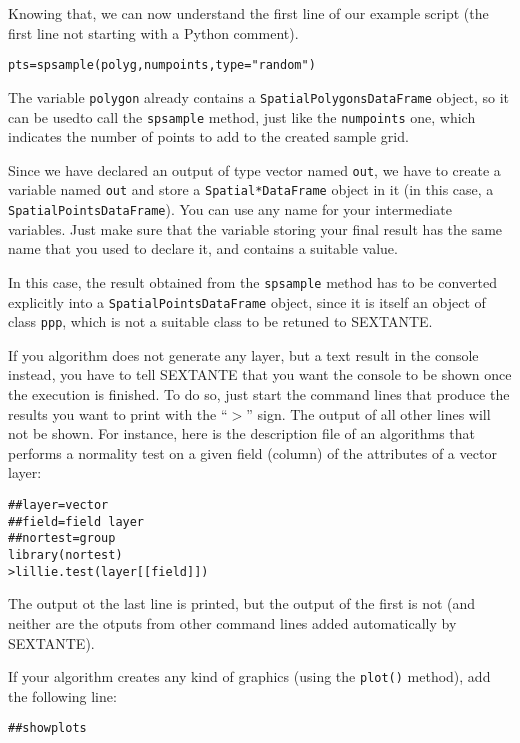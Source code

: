 Knowing that, we can now understand the first line of our example script (the first line not starting with a Python comment).


\begin{verbatim}
pts=spsample(polyg,numpoints,type="random")
\end{verbatim}

The variable \texttt{polygon} already contains a \texttt{SpatialPolygonsDataFrame} object, so it can be usedto call the \texttt{spsample} method, just like the \texttt{numpoints} one, which indicates the number of points to add to the created sample grid.

Since we have declared an output of type vector named \texttt{out}, we have to create a variable named \texttt{out} and store a \texttt{Spatial*DataFrame} object in it (in this case, a \texttt{SpatialPointsDataFrame}). You can use any name for your intermediate variables. Just make sure that the variable storing your final result has the same name that you used to declare it, and contains a suitable value.

In this case, the result obtained from the \texttt{spsample} method has to be converted explicitly into a \texttt{SpatialPointsDataFrame} object, since it is itself an object of class \texttt{ppp}, which is not a suitable class to be retuned to SEXTANTE.

If you algorithm does not generate any layer, but a text result in the console instead, you have to tell SEXTANTE that you want the console to be shown once the execution is finished. To do so, just start the command lines that produce the results you want to print with the ``$>$'' sign. The output of all other lines will not be shown. For instance, here is the description file of an algorithms that performs a normality test on a given field (column) of the attributes of a vector layer:

\begin{verbatim}
##layer=vector
##field=field layer
##nortest=group
library(nortest)
>lillie.test(layer[[field]]) 	
\end{verbatim}

The output ot the last line is printed, but the output of the first is not (and neither are the otputs from other command lines added automatically by SEXTANTE).

If your algorithm creates any kind of graphics (using the \texttt{plot()} method), add the following line:

\begin{verbatim}
##showplots
\end{verbatim}


